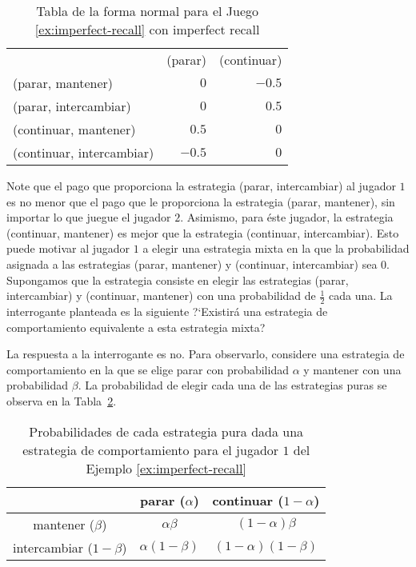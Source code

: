 \begin{table}[hbt]
\begin{center}
\caption[Tabla de la forma normal para un juego con \textit{imperfect recall}]{Tabla de la forma normal para el Juego \ref{ex:imperfect-recall} con imperfect recall}
\label{table:imperfect-recall}
\begin{tabular}{l | r | r |}
\multicolumn{1}{c}{} & \multicolumn{1}{c}{(parar)} & \multicolumn{1}{c}{(continuar)} \\ \cline{2-3}
(parar,     mantener)     & $0$ & $-0.5$ \\ \cline{2-3}
(parar,     intercambiar) & $0$ & $0.5$ \\ \cline{2-3}
(continuar, mantener)     & $0.5$ & $0$ \\ \cline{2-3}
(continuar, intercambiar) & $-0.5$ & $0$ \\ \cline{2-3}
\end{tabular}
\end{center}
\end{table}

Note que el pago que proporciona la estrategia (parar, intercambiar) al jugador $1$ es no menor que el pago que le proporciona la estrategia (parar, mantener), sin importar lo que juegue el jugador $2$. Asimismo, para éste jugador, la estrategia (continuar, mantener) es mejor que la estrategia (continuar, intercambiar). Esto puede motivar al jugador $1$ a elegir una estrategia mixta en la que la probabilidad asignada a las estrategias (parar, mantener) y (continuar, intercambiar) sea $0$. Supongamos que la estrategia consiste en elegir las estrategias (parar, intercambiar) y (continuar, mantener) con una probabilidad de $\frac{1}{2}$ cada una. La interrogante planteada es la siguiente ?`Existirá una estrategia de comportamiento equivalente a esta estrategia mixta?

La respuesta a la interrogante es no. Para observarlo, considere una estrategia de comportamiento en la que se elige parar con probabilidad $\alpha$ y mantener con una probabilidad $\beta$. La probabilidad de elegir cada una de las estrategias puras se observa en la Tabla~\ref{table:proba-ep}.

\begin{table}[hbt]
\begin{center}
\caption[Probabilidades de las Estrategias Puras]{Probabilidades de cada estrategia pura dada una estrategia de comportamiento para el jugador $1$ del Ejemplo \ref{ex:imperfect-recall}}
\label{table:proba-ep}
\begin{tabular}{c c c}
\hline
& parar ($\alpha$) & continuar ($1 - \alpha$) \\ \hline
mantener ($\beta$)       & $\alpha\beta$     & $(1-\alpha)\beta$    \\
intercambiar ($1-\beta$) & $\alpha(1-\beta)$ & $(1-\alpha)(1-\beta)$\\ \hline
\end{tabular}
\end{center}
\end{table}

